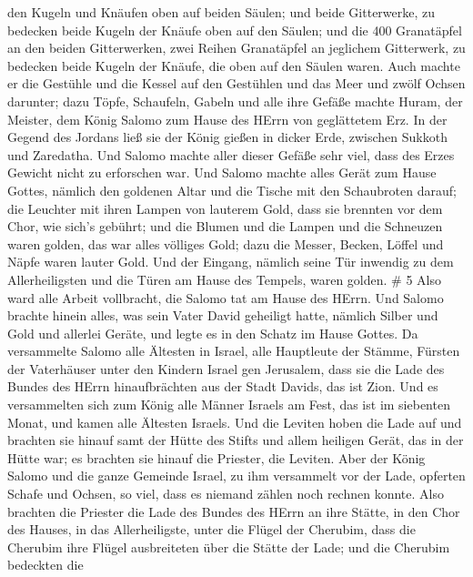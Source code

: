 den Kugeln und Knäufen oben auf beiden Säulen; und beide Gitterwerke, zu
bedecken beide Kugeln der Knäufe oben auf den Säulen;  und
die 400 Granatäpfel an den beiden Gitterwerken, zwei Reihen Granatäpfel
an jeglichem Gitterwerk, zu bedecken beide Kugeln der Knäufe, die oben
auf den Säulen waren.  Auch machte er die Gestühle und die
Kessel auf den Gestühlen  und das Meer und zwölf Ochsen
darunter;  dazu Töpfe, Schaufeln, Gabeln und alle ihre
Gefäße machte Huram, der Meister, dem König Salomo zum Hause des HErrn
von geglättetem Erz.  In der Gegend des Jordans ließ sie
der König gießen in dicker Erde, zwischen Sukkoth und Zaredatha.
 Und Salomo machte aller dieser Gefäße sehr viel, dass des
Erzes Gewicht nicht zu erforschen war.  Und Salomo machte
alles Gerät zum Hause Gottes, nämlich den goldenen Altar und die Tische
mit den Schaubroten darauf;  die Leuchter mit ihren Lampen
von lauterem Gold, dass sie brennten vor dem Chor, wie sich's gebührt;
 und die Blumen und die Lampen und die Schneuzen waren
golden, das war alles völliges Gold;  dazu die Messer,
Becken, Löffel und Näpfe waren lauter Gold. Und der Eingang, nämlich
seine Tür inwendig zu dem Allerheiligsten und die Türen am Hause des
Tempels, waren golden. \# 5  Also ward alle Arbeit
vollbracht, die Salomo tat am Hause des HErrn. Und Salomo brachte hinein
alles, was sein Vater David geheiligt hatte, nämlich Silber und Gold und
allerlei Geräte, und legte es in den Schatz im Hause Gottes.
 Da versammelte Salomo alle Ältesten in Israel, alle
Hauptleute der Stämme, Fürsten der Vaterhäuser unter den Kindern Israel
gen Jerusalem, dass sie die Lade des Bundes des HErrn hinaufbrächten aus
der Stadt Davids, das ist Zion.  Und es versammelten sich
zum König alle Männer Israels am Fest, das ist im siebenten Monat,
 und kamen alle Ältesten Israels. Und die Leviten hoben die
Lade auf  und brachten sie hinauf samt der Hütte des Stifts
und allem heiligen Gerät, das in der Hütte war; es brachten sie hinauf
die Priester, die Leviten.  Aber der König Salomo und die
ganze Gemeinde Israel, zu ihm versammelt vor der Lade, opferten Schafe
und Ochsen, so viel, dass es niemand zählen noch rechnen konnte.
 Also brachten die Priester die Lade des Bundes des HErrn an
ihre Stätte, in den Chor des Hauses, in das Allerheiligste, unter die
Flügel der Cherubim,  dass die Cherubim ihre Flügel
ausbreiteten über die Stätte der Lade; und die Cherubim bedeckten die
